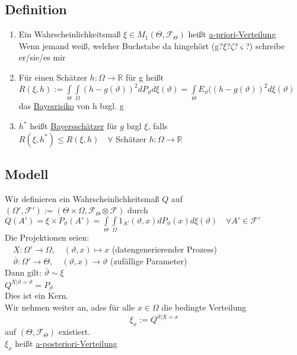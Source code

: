 \documentclass[german,10pt,oneside, fleqn, a4paper]{article}
\newcommand {\R}	{\mathbb{R}}
\newcommand{\ra}{\rightarrow}
\newcommand{\mc}[1]{\mathcal{#1}}
\newcommand{\1}[1]{1_{#1}}
\newcommand{\2}[1]{\1{\brac{#1}}}
\newcommand{\f}{\mc{F}}
\newcommand{\qf}{\quad\forall}
\begin{document}
\subsection{Definition}
\label{14.1}
\begin{enumerate}[label=(\alph*)]
\item Ein Wahrscheinlichkeitsmaß $\xi\in M_1(\Theta,\f_\Theta)$ heißt \underline{a-priori-Verteilung}\\Wenn jemand weiß, welcher Buchstabe da hingehört (g?$\xi$?$\zeta$?$\varsigma$?) schreibe er/sie/es mir
\item Für einen Schätzer $h:\Omega\ra\R$ für g heißt \\
$R(\xi,h):=\int\limits_\Theta\int\limits_\Omega (h-g(\vartheta))^2dP_\vartheta d\xi(\vartheta)=\int\limits_\Theta E_\vartheta((h-g(\vartheta))^2d\xi(\vartheta)$ \\das \underline{Bayesrisiko} von h bzgl. g
\item $h^*$ heißt \underline{Bayersschätzer} für $g$ bzgl $\xi$, falls\\ $R(\xi,h^*)\leq R(\xi,h)\qf$ Schätzer $h:\Omega\ra\R$
\end{enumerate}

\subsection{Modell}
\label{14.2}
Wir definieren ein Wahrscheinlichkeitsmaß $Q$ auf $(\Omega',\f'):=(\Theta\times\Omega,\f_\Theta\otimes\f)$ durch\\
$Q(A')=\xi\times P_\vartheta(A')=\int\limits_\Theta\int\limits_\Omega 1_{A'}(\vartheta,x)dP_\vartheta(x)d\xi(\vartheta)\qf A'\in\f'$\\
Die Projektionen seien:\\
$\quad X:\Omega'\ra\Omega,\quad(\vartheta,x)\mapsto x$ (datengenerierender Prozess)\\
$\quad \overline{\vartheta}:\Omega'\ra\Theta,\quad(\vartheta,x)\ra\vartheta$ (zufällige Parameter)\\
Dann gilt:
$\overline\vartheta\sim\xi$\\
$Q^{X|\overline\vartheta=\vartheta}=P_\vartheta$\\
Dies ist ein Kern.\\
Wir nehmen weiter an, adss für alle $x\in\Omega$ die bedingte Verteilung \[\xi_x:=Q^{\overline\vartheta|X=x}\]
auf $(\Theta,\f_\Theta)$ existiert.\\
$\xi_x$ heißt \underline{a-posteriori-Verteilung}
\end{document}
